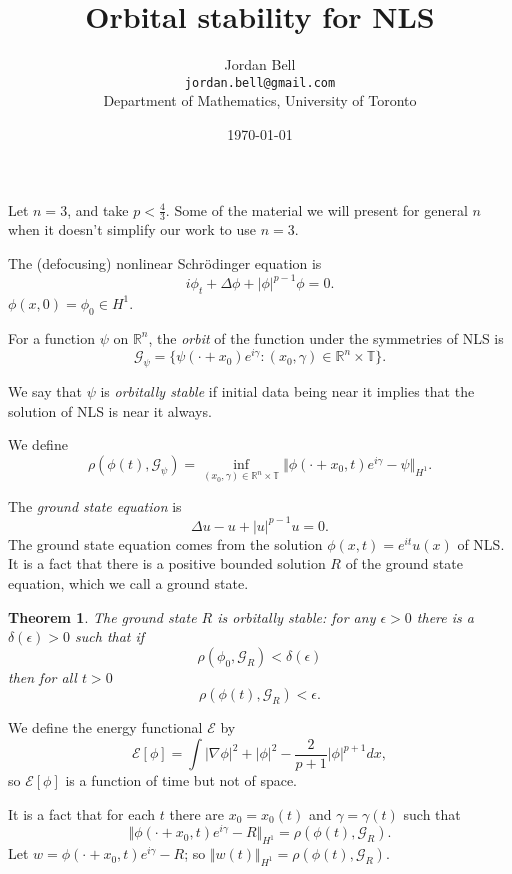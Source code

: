 \documentclass{article}
\newtheorem{theorem}{Theorem}
\newcommand{\norm}[1]{\Vert #1 \Vert}
\begin{document}
\title{Orbital stability for NLS}
\author{Jordan Bell\\ \texttt{jordan.bell@gmail.com}\\Department of Mathematics, University of Toronto}
\date{\today}     
\maketitle

Let $n=3$, and take $p<\frac{4}{3}$. Some of the material we will present for general $n$ when it doesn't simplify our work to use $n=3$.

The (defocusing) nonlinear Schr\"odinger equation is
\[
i\phi_t + \Delta \phi + |\phi|^{p-1}\phi=0.
\]
$\phi(x,0)=\phi_0 \in H^1$.

For a function $\psi$ on $\mathbb{R}^n$, the {\em orbit} of the function under the symmetries of NLS is
\[
\mathscr{G}_\psi=\{\psi(\cdot+x_0)e^{i\gamma}:(x_0,\gamma) \in \mathbb{R}^n \times \mathbb{T}\}.
\]

We say that $\psi$ is {\em orbitally stable} if initial data being near it implies that the solution of NLS is near it always.

We define
\[
\rho(\phi(t),\mathscr{G}_\psi)=\inf_{(x_0,\gamma) \in \mathbb{R}^n \times \mathbb{T}} \norm{\phi(\cdot+x_0,t)e^{i\gamma}-\psi}_{H^1}.
\]

The {\em ground state equation} is
\[
\Delta u-u+|u|^{p-1}u=0.
\]
The ground state equation comes from the solution $\phi(x,t)=e^{it}u(x)$ of NLS. It is a fact that there is a positive bounded solution $R$ of the ground state equation, which we call a ground state.

\begin{theorem}
The ground state $R$ is orbitally stable: for any $\epsilon>0$ there is a $\delta(\epsilon)>0$ such that if
\[
\rho(\phi_0,\mathscr{G}_R) < \delta(\epsilon)
\]
then for all $t>0$
\[
\rho(\phi(t),\mathscr{G}_R)<\epsilon.
\]
\end{theorem}

We define the energy functional $\mathscr{E}$ by
\[
\mathscr{E}[\phi]=\int |\nabla \phi|^2+|\phi|^2-\frac{2}{p+1}|\phi|^{p+1}dx,
\]
so $\mathscr{E}[\phi]$ is a function of time but not of space.

It is a fact that for each $t$ there are $x_0=x_0(t)$ and $\gamma=\gamma(t)$ such that
\[
\norm{\phi(\cdot+x_0,t)e^{i\gamma}-R}_{H^1}=\rho(\phi(t),\mathscr{G}_R).
\]
Let $w=\phi(\cdot+x_0,t)e^{i\gamma}-R$; so $\norm{w(t)}_{H^1}=\rho(\phi(t),\mathscr{G}_R)$.
 
\end{document}
